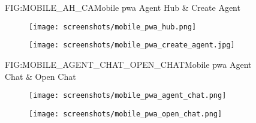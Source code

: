 \begin{figure}[Mobile -- Agent Hub \& Create Agent]{FIG:MOBILE_AH_CA}{Mobile \ac{pwa} Agent Hub \& Create Agent}
    \begin{subfigure}[FIG:MOBILE_AGENT_HUB]{Agent Hub}{\texttt{[image: screenshots/mobile\_pwa\_hub.png]}}
    \end{subfigure}
    \hspace{2em}
    \begin{subfigure}[FIG:MOBILE_CREATE_AGENT]{Create Agent}{\texttt{[image: screenshots/mobile\_pwa\_create\_agent.jpg]}}
    \end{subfigure}
\end{figure}

\begin{figure}[Mobile -- Agent Chat \& Open Chat]{FIG:MOBILE_AGENT_CHAT_OPEN_CHAT}{Mobile \ac{pwa} Agent Chat \& Open Chat}
    \begin{subfigure}[FIG:MOBILE_AGENT_CHAT]{Agent Chat}{\texttt{[image: screenshots/mobile\_pwa\_agent\_chat.png]}}
    \end{subfigure}
    \hspace{2em}
    \begin{subfigure}[FIG:MOBILE_OPEN_CHAT]{Open Chat}{\texttt{[image: screenshots/mobile\_pwa\_open\_chat.png]}}
    \end{subfigure}
\end{figure}
